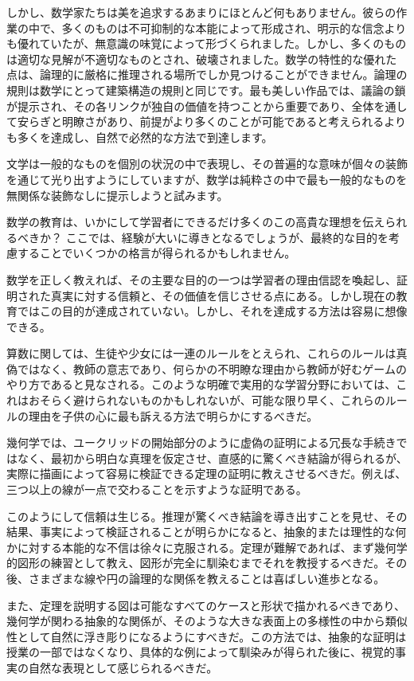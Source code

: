 \documentclass[a4paper,11pt,openany]{ltjsbook}
\begin{document}
しかし、数学家たちは美を追求するあまりにほとんど何もありません。彼らの作業の中で、多くのものは不可抑制的な本能によって形成され、明示的な信念よりも優れていたが、無意識の味覚によって形づくられました。しかし、多くのものは適切な見解が不適切なものとされ、破壊されました。数学の特性的な優れた点は、論理的に厳格に推理される場所でしか見つけることができません。論理の規則は数学にとって建築構造の規則と同じです。最も美しい作品では、議論の鎖が提示され、その各リンクが独自の価値を持つことから重要であり、全体を通して安らぎと明瞭さがあり、前提がより多くのことが可能であると考えられるよりも多くを達成し、自然で必然的な方法で到達します。

文学は一般的なものを個別の状況の中で表現し、その普遍的な意味が個々の装飾を通じて光り出すようにしていますが、数学は純粋さの中で最も一般的なものを無関係な装飾なしに提示しようと試みます。

数学の教育は、いかにして学習者にできるだけ多くのこの高貴な理想を伝えられるべきか？
ここでは、経験が大いに導きとなるでしょうが、最終的な目的を考慮することでいくつかの格言が得られるかもしれません。

数学を正しく教えれば、その主要な目的の一つは学習者の理由信認を喚起し、証明された真実に対する信頼と、その価値を信じさせる点にある。しかし現在の教育ではこの目的が達成されていない。しかし、それを達成する方法は容易に想像できる。

算数に関しては、生徒や少女には一連のルールをとえられ、これらのルールは真偽ではなく、教師の意志であり、何らかの不明瞭な理由から教師が好むゲームのやり方であると見なされる。このような明確で実用的な学習分野においては、これはおそらく避けられないものかもしれないが、可能な限り早く、これらのルールの理由を子供の心に最も訴える方法で明らかにするべきだ。

幾何学では、ユークリッドの開始部分のように虚偽の証明による冗長な手続きではなく、最初から明白な真理を仮定させ、直感的に驚くべき結論が得られるが、実際に描画によって容易に検証できる定理の証明に教えさせるべきだ。例えば、三つ以上の線が一点で交わることを示すような証明である。

このようにして信頼は生じる。推理が驚くべき結論を導き出すことを見せ、その結果、事実によって検証されることが明らかになると、抽象的または理性的な何かに対する本能的な不信は徐々に克服される。定理が難解であれば、まず幾何学的図形の練習として教え、図形が完全に馴染むまでそれを教授するべきだ。その後、さまざまな線や円の論理的な関係を教えることは喜ばしい進歩となる。

また、定理を説明する図は可能なすべてのケースと形状で描かれるべきであり、幾何学が関わる抽象的な関係が、そのような大きな表面上の多様性の中から類似性として自然に浮き彫りになるようにすべきだ。この方法では、抽象的な証明は授業の一部ではなくなり、具体的な例によって馴染みが得られた後に、視覚的事実の自然な表現として感じられるべきだ。
\end{document}

